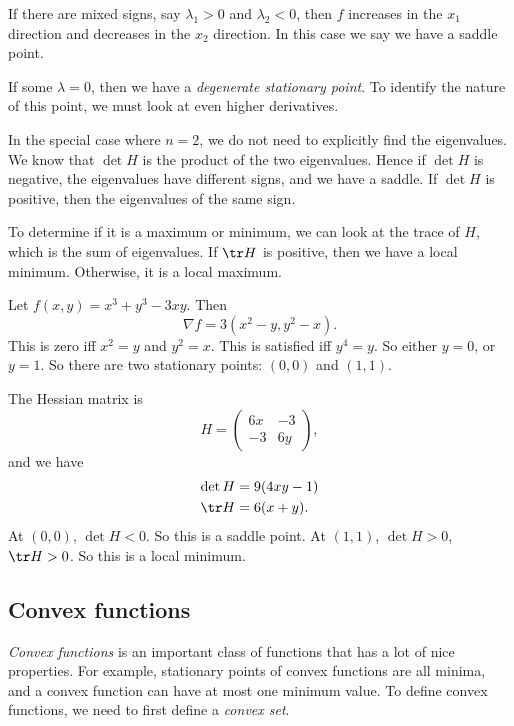 \documentclass[a4paper]{article}
\begin{document}
If there are mixed signs, say $\lambda_1 > 0$ and $\lambda_2 < 0$, then $f$ increases in the $x_1$ direction and decreases in the $x_2$ direction. In this case we say we have a saddle point.

If some $\lambda = 0$, then we have a \emph{degenerate stationary point}. To identify the nature of this point, we must look at even higher derivatives.

In the special case where $n = 2$, we do not need to explicitly find the eigenvalues. We know that $\det H$ is the product of the two eigenvalues. Hence if $\det H$ is negative, the eigenvalues have different signs, and we have a saddle. If $\det H$ is positive, then the eigenvalues of the same sign.

To determine if it is a maximum or minimum, we can look at the trace of $H$, which is the sum of eigenvalues. If $\tr H$ is positive, then we have a local minimum. Otherwise, it is a local maximum.

\begin{eg}
  Let $f(x, y) = x^3 + y^3 - 3xy$. Then
  \[
    \nabla f = 3(x^2 - y, y^2 - x).
  \]
  This is zero iff $x^2 = y$ and $y^2 = x$. This is satisfied iff $y^4 = y$. So either $y = 0$, or $y = 1$. So there are two stationary points: $(0, 0)$ and $(1, 1)$.

  The Hessian matrix is
  \[
    H =
    \begin{pmatrix}
      6x & -3\\
      -3 & 6y
    \end{pmatrix},
  \]
  and we have
  \begin{align*}
    \det H &= 9(4xy - 1)\\
    \tr H &= 6(x + y).
  \end{align*}
  At $(0, 0)$, $\det H < 0$. So this is a saddle point. At $(1, 1)$, $\det H > 0$, $\tr H > 0$. So this is a local minimum.
\end{eg}
\subsection{Convex functions}
\emph{Convex functions} is an important class of functions that has a lot of nice properties. For example, stationary points of convex functions are all minima, and a convex function can have at most one minimum value. To define convex functions, we need to first define a \emph{convex set}.
\end{document}
